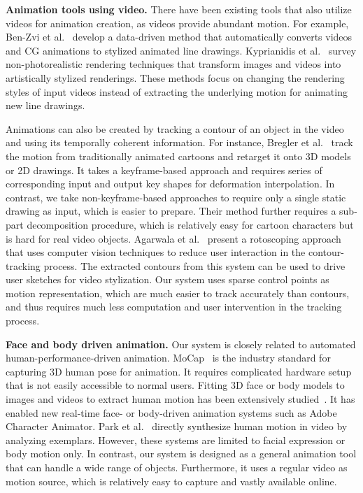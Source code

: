 \textbf{Animation tools using video.} There have been existing tools that also utilize videos for animation creation, as videos provide abundant motion. For example, Ben-Zvi et al.~ develop a data-driven method that automatically converts videos and CG animations to stylized animated 
line drawings.  %
Kyprianidis et al.~ survey non-photorealistic rendering techniques that transform images and videos into artistically stylized renderings.
These methods focus on changing the rendering styles of input videos instead of extracting the underlying motion for animating new line drawings. 

Animations can also be created by tracking a contour of an object in the video and using its temporally coherent information.
For instance, Bregler et al.~ track the motion from traditionally animated cartoons and retarget it onto 3D models or 2D drawings.
It takes a keyframe-based approach and requires series of corresponding input and output key shapes for deformation interpolation. In contrast, we take non-keyframe-based approaches to require only a single static drawing as input, which is easier to prepare.
Their method further requires a sub-part decomposition procedure, which is relatively easy for cartoon characters but is hard for real video objects. 
Agarwala et al.~ present a rotoscoping approach that uses computer vision techniques to reduce user interaction in the contour-tracking process. 
The extracted contours from this system can be used to drive user sketches for video stylization. 
Our system uses sparse control points as motion representation, which are much easier to track accurately than contours, and thus requires much less computation and user intervention in the tracking process.

\textbf{Face and body driven animation.} 
Our system is closely related to automated human-performance-driven animation. 
MoCap~\cite{Kitagawa:2008} is the industry standard for capturing 3D human pose for animation. It requires complicated hardware setup that is not easily accessible to normal users. 
Fitting 3D face or body models to images and videos to extract human motion has been extensively studied~\cite{Chen:2012,Cao:2013,thies2016face,posemachine,Reinert:2016}. It has enabled new real-time face- or body-driven animation systems such as Adobe Character Animator. 
Park et al.~ directly synthesize human motion in video by analyzing exemplars.
However, these systems are limited to facial expression or body motion only. In contrast, our system is designed as a general animation tool that can handle a wide range of objects. Furthermore, it uses a regular video as motion source, which is relatively easy to capture and vastly available online. 

